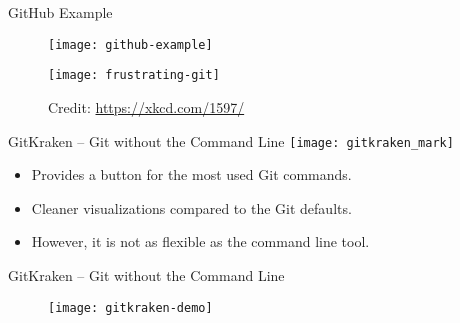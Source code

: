 \documentclass{beamer}
\begin{document}
\begin{frame}{GitHub Example}
  \begin{figure}
    \texttt{[image: github-example]}
  \end{figure}
\end{frame}

\begin{frame}{}
  \begin{figure}
    \texttt{[image: frustrating-git]}
    \caption{
      Credit: \url{https://xkcd.com/1597/}
    }
  \end{figure}
\end{frame}

\begin{frame}{GitKraken -- Git without the Command Line}
  \center \texttt{[image: gitkraken\_mark]}

  \begin{itemize}
    \item Provides a button for the most used Git commands.

    \item Cleaner visualizations compared to the Git defaults.

    \item However, it is not as flexible as the command line tool.
  \end{itemize}
\end{frame}

\begin{frame}{GitKraken -- Git without the Command Line}
  \begin{figure}
    \centering
    \texttt{[image: gitkraken-demo]}
  \end{figure}
\end{frame}





\end{document}
